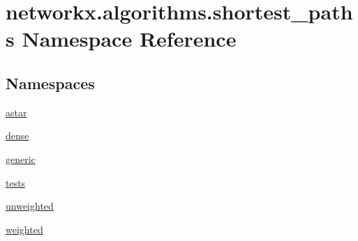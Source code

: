 \hypertarget{namespacenetworkx_1_1algorithms_1_1shortest__paths}{}\section{networkx.\+algorithms.\+shortest\+\_\+paths Namespace Reference}
\label{namespacenetworkx_1_1algorithms_1_1shortest__paths}
\subsection*{Namespaces}
\begin{DoxyCompactItemize}
\item 
 \hyperlink{namespacenetworkx_1_1algorithms_1_1shortest__paths_1_1astar}{astar}
\item 
 \hyperlink{namespacenetworkx_1_1algorithms_1_1shortest__paths_1_1dense}{dense}
\item 
 \hyperlink{namespacenetworkx_1_1algorithms_1_1shortest__paths_1_1generic}{generic}
\item 
 \hyperlink{namespacenetworkx_1_1algorithms_1_1shortest__paths_1_1tests}{tests}
\item 
 \hyperlink{namespacenetworkx_1_1algorithms_1_1shortest__paths_1_1unweighted}{unweighted}
\item 
 \hyperlink{namespacenetworkx_1_1algorithms_1_1shortest__paths_1_1weighted}{weighted}
\end{DoxyCompactItemize}
